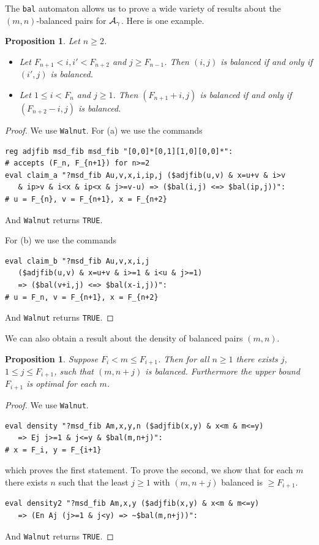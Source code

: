 \documentclass[final]{dmtcs-episciences}
\theoremstyle{plain}
\newtheorem{proposition}[theorem]{Proposition}
\theoremstyle{remark}
\begin{document}
The {\tt bal} automaton allows us to prove a wide variety of results about the $(m,n)$-balanced pairs for ${\cal A}_{\gamma}$.  Here is one example.

\begin{proposition}
Let $n \geq 2$.
\begin{itemize}
  \item[(a)] 
  Let $F_{n+1} < i,i' < F_{n+2}$ and $j \geq F_{n-1}$.
  Then $(i,j)$ is balanced if and only if $(i',j)$ is balanced.
    \item[(b)]
    Let $1 \leq i < F_n$
    and $j \geq 1$.
    Then $(F_{n+1} + i,j)$
    is balanced if and only if
    $(F_{n+2} -i, j)$
    is balanced.
\end{itemize}
\end{proposition}

\begin{proof}
We use {\tt Walnut}.
For (a) we use the commands
\begin{verbatim}
reg adjfib msd_fib msd_fib "[0,0]*[0,1][1,0][0,0]*":
# accepts (F_n, F_{n+1}) for n>=2
eval claim_a "?msd_fib Au,v,x,i,ip,j ($adjfib(u,v) & x=u+v & i>v 
   & ip>v & i<x & ip<x & j>=v-u) => ($bal(i,j) <=> $bal(ip,j))":
# u = F_{n}, v = F_{n+1}, x = F_{n+2}
\end{verbatim}
And {\tt Walnut} returns {\tt TRUE}.

For (b) we use the commands
\begin{verbatim}
eval claim_b "?msd_fib Au,v,x,i,j 
   ($adjfib(u,v) & x=u+v & i>=1 & i<u & j>=1) 
   => ($bal(v+i,j) <=> $bal(x-i,j))":
# u = F_n, v = F_{n+1}, x = F_{n+2}
\end{verbatim}
And {\tt Walnut} returns {\tt TRUE}.
\end{proof}

We can also obtain a result about the density of balanced pairs $(m,n)$.
\begin{proposition}
Suppose $F_i < m \leq F_{i+1}$.  Then for all $n\geq 1$ there exists $j$,
$1 \leq j \leq F_{i+1}$, 
such that $(m,n+j)$
is balanced.   Furthermore the upper bound $F_{i+1}$ is optimal for each $m$.
\end{proposition}

\begin{proof}
We use {\tt Walnut}.
\begin{verbatim}
eval density "?msd_fib Am,x,y,n ($adjfib(x,y) & x<m & m<=y) 
   => Ej j>=1 & j<=y & $bal(m,n+j)":
# x = F_i, y = F_{i+1}
\end{verbatim}
which proves the first statement.  To prove the second, we show that for each $m$
there exists $n$ such that the least $j\geq 1$
with $(m,n+j)$ balanced is $\geq F_{i+1}$.
\begin{verbatim}
eval density2 "?msd_fib Am,x,y ($adjfib(x,y) & x<m & m<=y) 
   => (En Aj (j>=1 & j<y) => ~$bal(m,n+j))":
\end{verbatim}
And {\tt Walnut} returns {\tt TRUE}.
\end{proof}
\end{document}
